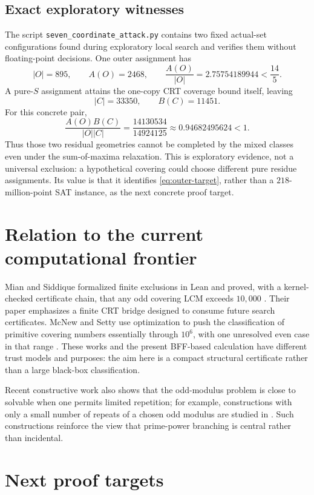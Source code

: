 \documentclass[11pt]{article}
\theoremstyle{definition}
\begin{document}
\subsection{Exact exploratory witnesses}

The script \texttt{seven\_coordinate\_attack.py} contains two fixed actual-set configurations
found during exploratory local search and verifies them without floating-point decisions.  One
outer assignment has
\[
 |O|=895,
 \qquad
 A(O)=2468,
 \qquad
 \frac{A(O)}{|O|}=2.75754189944<\frac{14}{5}.
\]
A pure-$S$ assignment attains the one-copy CRT coverage bound itself, leaving
\[
 |C|=33350,
 \qquad
 B(C)=11451.
\]
For this concrete pair,
\[
 \frac{A(O)B(C)}{|O||C|}
 =\frac{14130534}{14924125}
 \approx0.94682495624<1.
\]
Thus those two residual geometries cannot be completed by the mixed classes even under the
sum-of-maxima relaxation.  This is exploratory evidence, not a universal exclusion: a
hypothetical covering could choose different pure residue assignments.  Its value is that it
identifies \eqref{eq:outer-target}, rather than a $218$-million-point SAT instance, as the next
concrete proof target.

\section{Relation to the current computational frontier}

Mian and Siddique formalized finite exclusions in Lean and proved, with a kernel-checked
certificate chain, that any odd covering LCM exceeds $10{,}000$ \cite{MianSiddique2026}.  Their
paper emphasizes a finite CRT bridge designed to consume future search certificates.  McNew and
Setty use optimization to push the classification of primitive covering numbers essentially
through $10^6$, with one unresolved even case in that range \cite{McNewSetty2026}.  These works
and the present BFF-based calculation have different trust models and purposes: the aim here is
a compact structural certificate rather than a large black-box classification.

Recent constructive work also shows that the odd-modulus problem is close to solvable when one
permits limited repetition; for example, constructions with only a small number of repeats of a
chosen odd modulus are studied in \cite{Bispels2025}.  Such constructions reinforce the view
that prime-power branching is central rather than incidental.

\section{Next proof targets}
\end{document}
